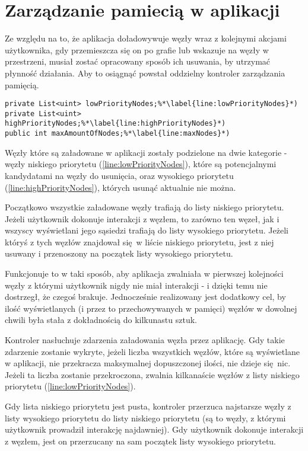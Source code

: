 \section{Zarządzanie pamiecią w aplikacji}
\label{sec:pamiec}
Ze względu na to, że aplikacja doładowywuje węzły wraz z kolejnymi akcjami użytkownika, gdy przemieszcza się on po grafie lub wskazuje na węzły w przestrzeni, musiał zostać opracowany sposób ich usuwania, by utrzymać płynność działania. Aby to osiągnąć powstał oddzielny kontroler zarządzania pamięcią.

\begin{lstlisting}[caption={Pomocnicze struktury i zmienne kontrolera zarządzania pamięcią}, label=lst:nodePriority]
private List<uint> lowPriorityNodes;%*\label{line:lowPriorityNodes}*)
private List<uint> highPriorityNodes;%*\label{line:highPriorityNodes}*)
public int maxAmountOfNodes;%*\label{line:maxNodes}*)
\end{lstlisting}

Węzły które są załadowane w aplikacji zostały podzielone na dwie kategorie - węzły niskiego priorytetu (\ref{line:lowPriorityNodes}), które są potencjalnymi kandydatami na węzły do usunięcia, oraz wysokiego priorytetu (\ref{line:highPriorityNodes}), których usunąć aktualnie nie można.

Początkowo wszystkie załadowane węzły trafiają do listy niskiego priorytetu. Jeżeli użytkownik dokonuje interakcji z węzłem, to zarówno ten węzeł, jak i wszyscy wyświetlani jego sąsiedzi trafiają do listy wysokiego priorytetu. Jeżeli któryś z tych węzłów znajdował się w liście niskiego priorytetu, jest z niej usuwany i przenoszony na początek listy wysokiego priorytetu.

Funkcjonuje to w taki sposób, aby aplikacja zwalniała w pierwszej kolejności węzły z którymi użytkownik nigdy nie miał interakcji - i dzięki temu nie dostrzegł, że czegoś brakuje. Jednocześnie realizowany jest dodatkowy cel, by ilość wyświetlanych (i przez to przechowywanych w pamięci) węzłów w dowolnej chwili była stała z dokładnością do kilkunastu sztuk.

Kontroler nasłuchuje zdarzenia załadowania węzła przez aplikację. Gdy takie zdarzenie zostanie wykryte, jeżeli liczba wszystkich węzłów, które są wyświetlane w aplikacji, nie przekracza maksymalnej dopuszczonej ilości, nie dzieje się nic. Jeżeli ta liczba zostanie przekroczona, zwalnia kilkanaście węzłów z listy niskiego priorytetu (\ref{line:lowPriorityNodes}).

Gdy lista niskiego priorytetu jest pusta, kontroler przerzuca najstarsze węzły z listy wysokiego priorytetu do listy niskiego priorytetu (są to węzły, z którymi użytkownik prowadził interakcję najdawniej). Gdy użytkownik dokonuje interakcji z węzłem, jest on przerzucany na sam początek listy wysokiego priorytetu.